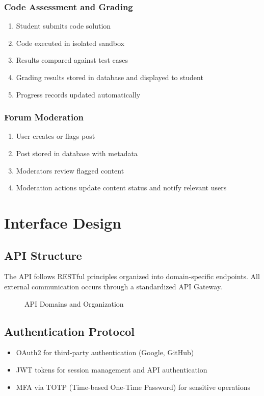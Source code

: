 \documentclass[a4paper, 11pt]{scrreprt}
\begin{document}
\subsection{Code Assessment and Grading}
\begin{enumerate}
    \item Student submits code solution
    \item Code executed in isolated sandbox
    \item Results compared against test cases
    \item Grading results stored in database and displayed to student
    \item Progress records updated automatically
\end{enumerate}

\subsection{Forum Moderation}
\begin{enumerate}
    \item User creates or flags post
    \item Post stored in database with metadata
    \item Moderators review flagged content
    \item Moderation actions update content status and notify relevant users
\end{enumerate}

\chapter{Interface Design}

\section{API Structure}
The API follows RESTful principles organized into domain-specific endpoints. All external communication occurs through a standardized API Gateway.

\begin{figure}[ht]
    \centering
    \caption{API Domains and Organization}
\end{figure}

\section{Authentication Protocol}
\begin{itemize}
    \item OAuth2 for third-party authentication (Google, GitHub)
    \item JWT tokens for session management and API authentication
    \item MFA via TOTP (Time-based One-Time Password) for sensitive operations
\end{itemize}
\end{document}
